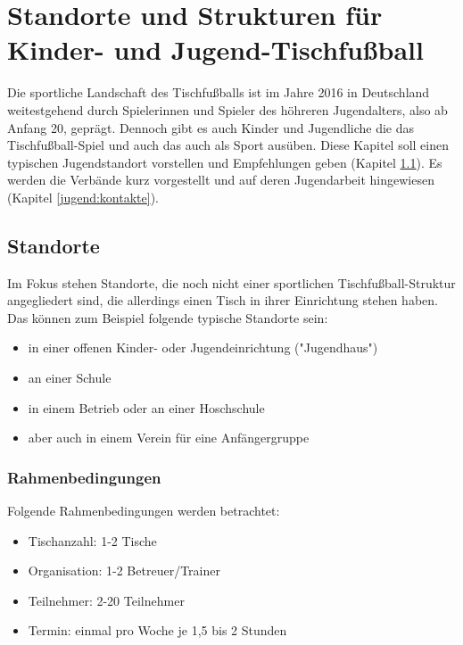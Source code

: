 \chapter{Standorte und Strukturen für Kinder- und Jugend-Tischfußball} 
\label{jugend}

Die sportliche Landschaft des Tischfußballs ist im Jahre 2016 in Deutschland weitestgehend durch Spielerinnen und Spieler des höhreren Jugendalters, also ab Anfang 20, geprägt. 
Dennoch gibt es auch Kinder und Jugendliche die das Tischfußball-Spiel und auch das auch als Sport ausüben. 
Diese Kapitel soll einen typischen Jugendstandort vorstellen und Empfehlungen geben (Kapitel \ref{jugend:standorte}). Es werden die Verbände kurz vorgestellt und auf deren Jugendarbeit hingewiesen (Kapitel \ref{jugend:kontakte}). 

\section{Standorte}
\label{jugend:standorte}

Im Fokus stehen Standorte, die noch nicht einer sportlichen Tischfußball-Struktur angegliedert sind, die allerdings einen Tisch in ihrer Einrichtung stehen haben. Das können zum Beispiel folgende typische Standorte sein: 
\begin{itemize}
\item in einer offenen Kinder- oder Jugendeinrichtung ("Jugendhaus")
\item an einer Schule
\item in einem Betrieb oder an einer Hoschschule
\item aber auch in einem Verein für eine Anfängergruppe  
\end{itemize}

\subsection{Rahmenbedingungen}
\label{jugend:standorte:rahmen}

Folgende Rahmenbedingungen werden betrachtet:
\begin{itemize}
\item Tischanzahl: 1-2 Tische
\item Organisation: 1-2 Betreuer/Trainer
\item Teilnehmer: 2-20 Teilnehmer 
\item Termin: einmal pro Woche je 1,5 bis 2 Stunden
\end{itemize}

